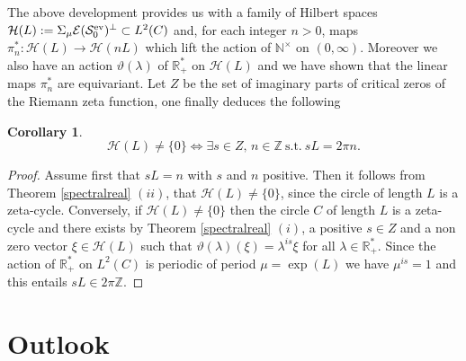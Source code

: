 \documentclass[cupthm]{CUP-JNL-JMJ}
\def\N{{\mathbb N}}
\def\R{{\mathbb R}}
\def\Z{{\mathbb Z}}
\def\cE{{\mathcal E}}
\def\cS{{\mathcal S}}
\def\cH{{\mathcal H}}
\def\rep{\vartheta}
\def\sr0{{\cS^{\rm ev}_0}}
\numberwithin{equation}{section}
\theoremstyle{cupplain}
\newtheorem{corollary}[theorem]{Corollary}
\theoremstyle{cupdefinition}
\theoremstyle{cupremark}
\theoremstyle{cupproof}
\newtheorem{proof}{Proof}
\begin{document}
The above development provides us with a family of Hilbert spaces $\cH(L):=\Sigma_\mu \cE(\sr0)^\perp\subset L^2(C)$ and,  for each integer $n>0$, maps $\pi^*_n:\cH(L)\to \cH(nL)$ which lift the action of $\N^\times$ on $(0,\infty)$. Moreover  we also have an action $\rep(\lambda)$ of $\R_+^*$ on $\cH(L)$ and  we have shown that the linear maps $\pi^*_n$ are equivariant. Let $Z$ be the set of imaginary parts of critical zeros of the Riemann zeta function, one  finally deduces the following 
\begin{corollary}\label{repetitions}
\begin{equation}\label{hlnotzero}
	\cH(L)\neq \{0\}\iff \exists s\in Z,\, n\in \Z ~{\text{s.t.}}~ sL=2 \pi n.
\end{equation}	
\end{corollary}
\begin{proof} Assume first that $sL=n$ with $s$ and $n$ positive. Then it follows from  Theorem \ref{spectralreal} $(ii)$, that $\cH(L)\neq \{0\}$, since the circle of length $L$ is a zeta-cycle. Conversely, if $\cH(L)\neq \{0\}$ then the circle $C$ of length $L$ is a zeta-cycle and there exists by Theorem \ref{spectralreal} $(i)$, a positive $s\in Z$ and a non zero vector  $\xi \in\cH(L)$ such that $\rep(\lambda)(\xi)=\lambda^{is}\xi$ for all $\lambda\in\R_+^*$. Since the action of $\R_+^*$ on $L^2(C)$ is periodic of period $\mu=\exp(L)$ we have $\mu^{is}=1$ and this entails $sL\in 2\pi \Z$. \end{proof}


\section{Outlook}
\end{document}

